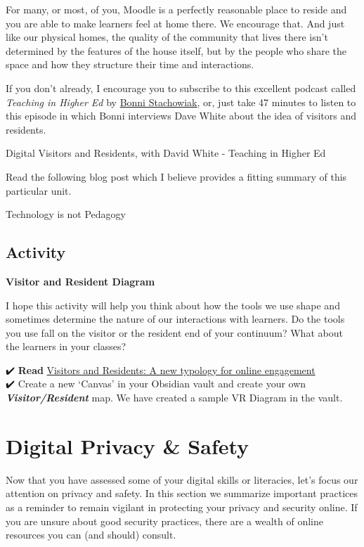 \documentclass[
]{book}
\theoremstyle{definition}
\theoremstyle{definition}
\theoremstyle{definition}
\theoremstyle{definition}
\theoremstyle{remark}
\begin{document}
For many, or most, of you, Moodle is a perfectly reasonable place to reside and you are able to make learners feel at home there. We encourage that. And just like our physical homes, the quality of the community that lives there isn't determined by the features of the house itself, but by the people who share the space and how they structure their time and interactions.

If you don't already, I encourage you to subscribe to this excellent podcast called \emph{Teaching in Higher Ed} by \href{https://twitter.com/bonni208}{Bonni Stachowiak}, or, just take 47 minutes to listen to this episode in which Bonni interviews Dave White about the idea of visitors and residents.

Digital Visitors and Residents, with David White - Teaching in Higher Ed

Read the following blog post which I believe provides a fitting summary of this particular unit.

Technology is not Pedagogy

\hypertarget{activity-3}{%
\subsection*{Activity}\label{activity-3}}

\begin{wp}
\textbf{Visitor and Resident Diagram}

I hope this activity will help you think about how the tools we use shape and sometimes determine the nature of our interactions with learners. Do the tools you use fall on the visitor or the resident end of your continuum? What about the learners in your classes?

✔️ \textbf{Read} \href{https://firstmonday.org/ojs/index.php/fm/article/view/3171}{Visitors and Residents: A new typology for online engagement}\\
✔️ Create a new `Canvas' in your Obsidian vault and create your own \textbf{\emph{Visitor/Resident}} map. We have created a sample VR Diagram in the vault.
\end{wp}

\hypertarget{digital-privacy-safety}{%
\section{Digital Privacy \& Safety}\label{digital-privacy-safety}}

Now that you have assessed some of your digital skills or literacies, let's focus our attention on privacy and safety. In this section we summarize important practices as a reminder to remain vigilant in protecting your privacy and security online. If you are unsure about good security practices, there are a wealth of online resources you can (and should) consult.
\end{document}
